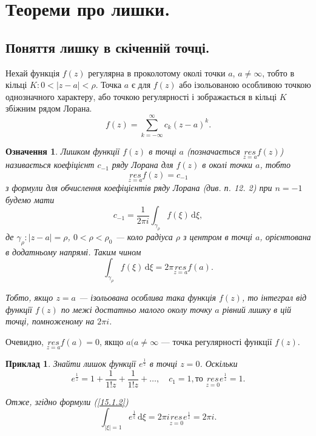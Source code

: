 \documentclass[12pt,fleqn]{article}
\newtheorem{exm}{Приклад}[section]
\theoremstyle{theorem}
\newtheorem{ozn}{Означення}[section]
\theoremstyle{proof}
\numberwithin{figure}{section}
\numberwithin{equation}{section}
\begin{document}
\section{Теореми про лишки.}
\subsection{Поняття лишку в скіченній точці.}
Нехай функція $f(z)$ регулярна в проколотому околі точки $a$, $a\neq\infty$, тобто в кільці $K: 0<|z-a|<\rho$. Точка $a$ є для $f(z)$ або ізольованою особливою точкою одно\-значного характеру, або точкою регулярності і зображається в кільці $K$ збіжним рядом Лорана.
$$f(z)=\sum_{k=-\infty}^{\infty}c_k(z-a)^k.$$

\begin{ozn}\label{ozn.15.1.1}
  Лишком функції $f(z)$ в точці $a$ (позначається $\underset{z=a}{res} f(z)$) нази\-вається коефіцієнт $c_{-1}$ ряду Лорана для $f(z)$ в околі точки $a$, тобто
  \begin{equation}\label{15.1.1}
    \underset{z=a}{res} f(z)=c_{-1}
  \end{equation}
  з формули для обчислення коефіцієнтів ряду Лорана (див. п. 12. 2) при $n=-1$ будемо мати
  \[c_{-1}=\frac{1}{2\pi i}\int_{\gamma_{\rho}}f(\xi)\,\mathrm{d}\xi,\]
  де $\gamma_{\rho}:|z-a|=\rho$, $0<\rho<\rho_0$ --- коло радіуса $\rho$ з центром в точці $a$, орієнтована в додатньому напрямі. Таким чином
    \begin{equation}\label{15.1.2}
    \int_{\gamma_{\rho}}f(\xi)\,\mathrm{d}\xi=2\pi \underset{z=a}{res}f(a).
  \end{equation}

  Тобто, якщо $z=a$ --- ізольована особлива така функція $f(z)$, то інтеграл від функції $f(z)$ по межі достатньо малого околу точку $a$  рівний лишку в цій точці, помноженому на $2\pi i$.
\end{ozn}

Очевидно, $\underset{z=a}{res}f(a) = 0$, якщо $a (a\neq \infty$ --- точка регулярності функції $f(z)$.

\begin{exm}\label{exm.15.1.1}
  Знайти лишок функції $e^{\frac{1}{z}}$ в точці $z=0$.
  Оскільки
  \[e^{\frac{1}{z}}=1+\frac{1}{1!z} + \frac{1}{1!z} + \dots, \quad c_1=1, \text{то } \underset{z=0}{res}e^{\frac{1}{z}}=1.\]

  Отже, згідно формули (\ref{15.1.2})
  \[\int_{|\xi|=1}e^{\frac{1}{\xi}}\,\mathrm{d}\xi=2\pi i \underset{z=0}{res} e^{\frac{1}{z}}=2\pi i.\]
\end{exm}
\end{document}
